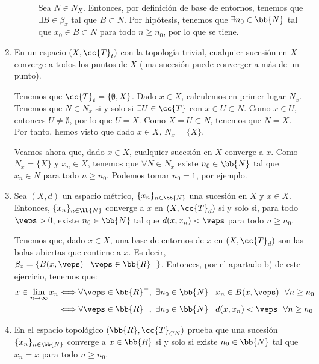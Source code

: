 \begin{ejercicio}
\begin{enumerate}[label=\alph*)]
\begin{description}
                Sea $N\in N_X$. Entonces, por definición de base de entornos, tenemos que $\exists B\in \beta_x$ tal que $B\subset N$. Por hipótesis, tenemos que $\exists n_0\in \bb{N}$ tal que $x_0\in B\subset N$ para todo $n\geq n_0$, por lo que se tiene.
        \end{description}   

        \item En un espacio $(X,\cc{T}_t)$ con la topología trivial, cualquier sucesión en $X$ converge a todos los puntos de $X$ (una sucesión puede converger a más de un punto).

        Tenemos que $\cc{T}_t=\{\emptyset, X\}$. Dado $x\in X$, calculemos en primer lugar $N_x$. Tenemos que $N\in N_x$ si y solo si $\exists U\in \cc{T}$ con $x\in U\subset N$. Como $x\in U$, entonces $U\neq \emptyset$, por lo que $U=X$. Como $X=U\subset N$, tenemos que $N=X$. Por tanto, hemos visto que dado $x\in X$, $N_x=\{X\}$.

        Veamos ahora que, dado $x\in X$, cualquier sucesión en $X$ converge a $x$. Como $N_x=\{X\}$ y $x_n\in X$, tenemos que $\forall N\in N_x$ existe $n_0\in \bb{N}$ tal que $x_n\in N$ para todo $n\geq n_0$. Podemos tomar $n_0=1$, por ejemplo.

        \item Sea $(X,d)$ un espacio métrico, $\{x_n\}_{n\in \bb{N}}$ una sucesión en $X$ y $x\in X$. Entonces, $\{x_n\}_{n\in \bb{N}}$ converge a $x$ en $(X,\cc{T}_d)$ si y solo si, para todo $\veps>0$, existe $n_0\in \bb{N}$ tal que $d(x,x_n)<\veps$ para todo $n\geq n_0$.

        Tenemos que, dado $x\in X$, una base de entornos de $x$ en $(X,\cc{T}_d)$ son las bolas abiertas que contiene a $x$. Es decir, $\beta_x=\{B(x,\veps)\mid \veps\in \bb{R}^+\}$. Entonces, por el apartado b) de este ejercicio, tenemos que:
        \begin{equation*}\begin{split}
            x\in \lim_{n\to \infty}x_n &\Longleftrightarrow
            \forall \veps\in \bb{R}^+,~ \exists n_0\in \bb{N}\mid x_n\in B(x,\veps)~~  \forall n\geq n_0\\
            &\Longleftrightarrow
            \forall \veps\in \bb{R}^+,~ \exists n_0\in \bb{N}\mid d(x,x_n)<\veps~~  \forall n\geq n_0
        \end{split}\end{equation*}

        \item En el espacio topológico $(\bb{R}, \cc{T}_{CN})$ prueba que una sucesión $\{x_n\}_{n\in \bb{N}}$ converge a $x\in \bb{R}$ si y solo si existe $n_0\in \bb{N}$ tal que $x_n=x$ para todo $n\geq n_0$.


\end{enumerate}
\end{ejercicio}
